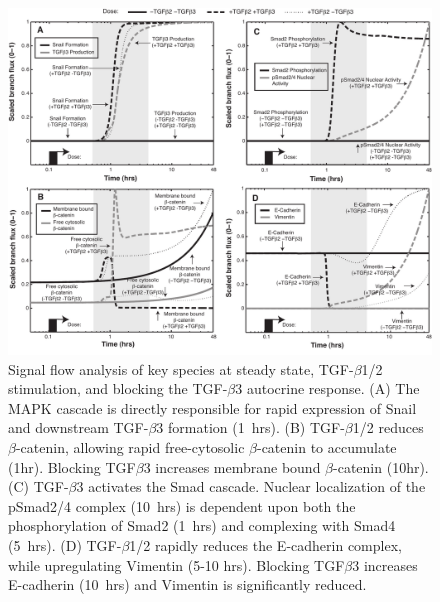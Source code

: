\begin{figure}
\includegraphics [width=1.0\linewidth] {./figs/Fig-1-Supplemental-FluxAnalysis.pdf}
\caption{Signal flow analysis of key species at steady state, TGF-$\beta$1/2 stimulation, and blocking the TGF-$\beta$3 autocrine response.
(A)  The MAPK cascade is directly responsible for rapid expression of Snail and downstream TGF-$\beta$3 formation (1~hrs).
(B) TGF-$\beta$1/2 reduces  $\beta$-catenin, allowing rapid free-cytosolic $\beta$-catenin to accumulate (1hr).
Blocking TGF$\beta$3 increases membrane bound $\beta$-catenin (10hr). (C)  TGF-$\beta$3 activates the Smad cascade.
Nuclear localization of the pSmad2/4 complex (10~hrs) is dependent upon both the phosphorylation of Smad2 (1~hrs) and complexing with Smad4 (5~hrs).
(D)  TGF-$\beta$1/2 rapidly reduces the E-cadherin complex, while upregulating Vimentin (5-10 hrs).
Blocking TGF$\beta$3 increases E-cadherin (10~hrs) and Vimentin is significantly reduced.}\label{fg:S1}
\end{figure}

